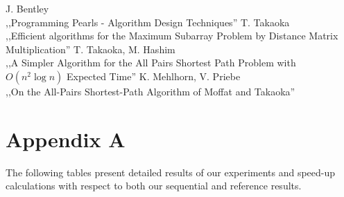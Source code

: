 \begin{thebibliography}{9}
     J. Bentley \\
        \newblock ,,Programming Pearls - Algorithm Design Techniques''
     T. Takaoka \\
        \newblock ,,Efficient algorithms for the Maximum Subarray Problem by Distance Matrix Multiplication''
     T. Takaoka, M. Hashim \\
        \newblock ,,A Simpler Algorithm for the All Pairs Shortest Path Problem with $O(n^2 \log{n})$ Expected Time''
     K. Mehlhorn, V. Priebe \\
        \newblock ,,On the All-Pairs Shortest-Path Algorithm of Moffat and Takaoka''
\end{thebibliography}

\newpage
\section*{Appendix A}

The following tables present detailed results of our experiments and speed-up calculations with respect to both our sequential and reference results. 


